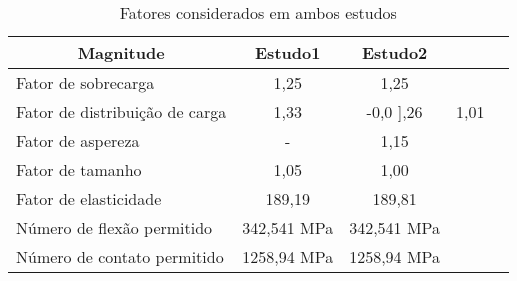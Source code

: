 \begin{table}[]
\centering
\caption{\label{tab:9} Fatores considerados em ambos estudos}
\begin{tabular}{l c c c c}
\hline
\multicolumn{1}{c}{\textbf{Magnitude}} & \textbf{Estudo1} & \textbf{Estudo2} \\ \hline
Fator de sobrecarga                 & 1,25              & 1,25 \\
Fator de distribuição de carga      & 1,33              & -0,0
],26              & 1,01              \\
Fator de aspereza                      & -                 & 1,15              \\
Fator de tamanho                       & 1,05              & 1,00              \\
Fator de elasticidade                  & 189,19            & 189,81            \\
Número de flexão permitido             & 342,541 MPa       & 342,541 MPa       \\
Número de contato permitido            & 1258,94 MPa       & 1258,94 MPa   \\ \hline  
\end{tabular}
\end{table}